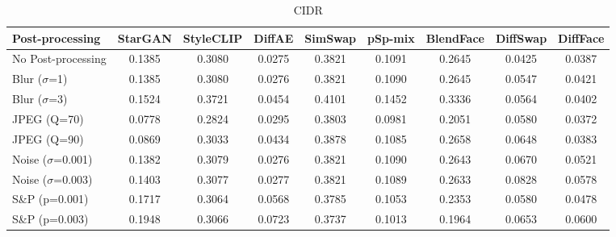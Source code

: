 \documentclass{article}
\begin{document}
\begin{table}[h!]
\begin{subtable}{\textwidth}
\caption{CIDR}
\centering
\scriptsize
\begin{tabular}{lcccccccc}
\toprule
\textbf{Post-processing} & StarGAN & StyleCLIP & DiffAE & SimSwap & pSp-mix & BlendFace & DiffSwap & DiffFace \\
\midrule
No Post-processing & 0.1385 & 0.3080 & 0.0275 & 0.3821 & 0.1091 & 0.2645 & 0.0425 & 0.0387 \\
\midrule
Blur ($\sigma$=1) & 0.1385 & 0.3080 & 0.0276 & 0.3821 & 0.1090 & 0.2645 & 0.0547 & 0.0421 \\
Blur ($\sigma$=3) & 0.1524 & 0.3721 & 0.0454 & 0.4101 & 0.1452 & 0.3336 & 0.0564 & 0.0402 \\
JPEG (Q=70) & 0.0778 & 0.2824 & 0.0295 & 0.3803 & 0.0981 & 0.2051 & 0.0580 & 0.0372 \\
JPEG (Q=90) & 0.0869 & 0.3033 & 0.0434 & 0.3878 & 0.1085 & 0.2658 & 0.0648 & 0.0383 \\
Noise ($\sigma$=0.001) & 0.1382 & 0.3079 & 0.0276 & 0.3821 & 0.1090 & 0.2643 & 0.0670 & 0.0521 \\
Noise ($\sigma$=0.003) & 0.1403 & 0.3077 & 0.0277 & 0.3821 & 0.1089 & 0.2633 & 0.0828 & 0.0578 \\
S\&P (p=0.001) & 0.1717 & 0.3064 & 0.0568 & 0.3785 & 0.1053 & 0.2353 & 0.0580 & 0.0478 \\
S\&P (p=0.003) & 0.1948 & 0.3066 & 0.0723 & 0.3737 & 0.1013 & 0.1964 & 0.0653 & 0.0600 \\
\bottomrule
\end{tabular}
\end{subtable}


\end{table}
\end{document}
